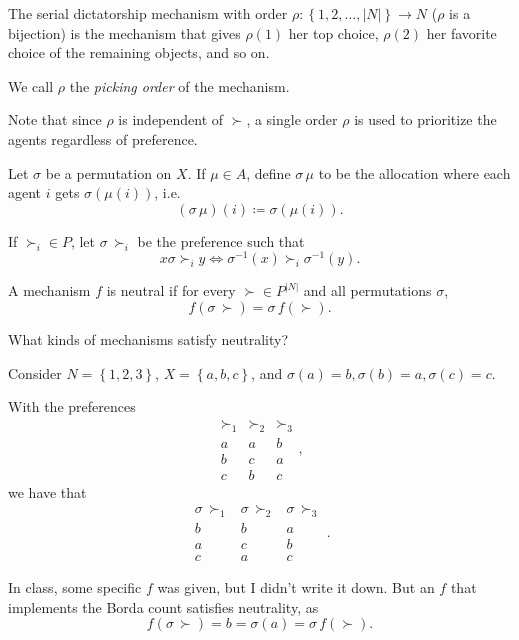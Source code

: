 \begin{definition}
	The serial dictatorship mechanism with order $\rho: \left\{1,2,\ldots,\left| N \right|\right\} \to N$ ($\rho$ is a bijection) is the mechanism that gives $\rho(1)$ her top choice, $\rho(2)$ her favorite choice of the remaining objects, and so on.

	We call $\rho$ the \emph{picking order} of the mechanism.
\end{definition}
Note that since $\rho$ is independent of $\succ$, a single order $\rho$ is used to prioritize the agents regardless of preference.

\begin{definition}[Neutrality]
	Let $\sigma$ be a permutation on $X$. If $\mu\in A$, define $\sigma\,\mu$ to be the allocation where each agent $i$ gets $\sigma(\mu(i))$, i.e. \[
		(\sigma\,\mu)(i) \coloneqq \sigma(\mu(i))
	.\] 

	If $\succ_i \in P$, let $\sigma\,\succ_i$ be the preference such that \[
		x \mathrel{\sigma\!\succ_i} y \iff \sigma^{-1}(x) \succ_i \sigma^{-1}(y)
	.\] 

	A mechanism $f$ is neutral if for every $\succ \in P^{\left| N \right|}$ and all permutations $\sigma$, \[
		f(\sigma\,\succ) = \sigma\,f(\succ)
	.\] 
\end{definition}

What kinds of mechanisms satisfy neutrality?
\begin{example}[Neutrality]
	Consider $N = \left\{1,2,3\right\}$, $X = \left\{a,b,c\right\}$, and $\sigma(a) = b, \sigma(b) = a, \sigma(c) = c$.

	With the preferences \[
			\begin{array}{ccc}
				\succ_1 & \succ_2 & \succ_3 \\
				\hline
				a & a & b \\
				b & c & a \\
				c & b & c	
			\end{array}
	,\] 
	we have that \[
			\begin{array}{ccc}
				\sigma\,\succ_1 & \sigma\,\succ_2 & \sigma\,\succ_3 \\
				\hline
				b & b & a \\
				a & c & b \\
				c & a & c	
			\end{array}
	.\]

	In class, some specific $f$ was given, but I didn't write it down. But an $f$ that implements the Borda count satisfies neutrality, as \[
		f(\sigma\, \succ) = b = \sigma(a) = \sigma\, f(\succ)
	.\] 
\end{example}

